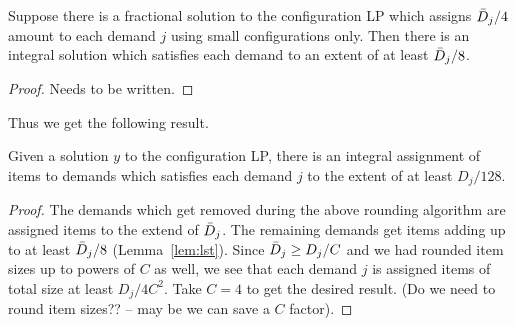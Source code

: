 \begin{lemma}
\label{lem:lst}
Suppose there is a fractional solution to the configuration LP which assigns ${\bar D}_j/4$ amount to each demand $j$ using small configurations only.
Then there is an integral solution which satisfies each demand to an extent of at least ${\bar D}_j/8$.
\end{lemma}
\begin{proof}
Needs to be written.
\end{proof}

Thus we get the following result.
\begin{theorem}
\label{thm:config}
Given a solution $y$ to the configuration LP, there is an integral assignment of items to demands which satisfies each demand $j$ to the extent of at least
$D_j/128$.
\end{theorem}
\begin{proof}
The demands which get removed during the above rounding algorithm are assigned items to the extend of ${\bar D}_j$. The remaining demands
get items adding up to at least ${\bar D}_j/8$ (Lemma~\ref{lem:lst}). Since ${\bar D}_j \geq D_j/C$ and we had rounded item sizes up to powers of $C$ as
well, we see that each demand $j$ is assigned items of total size at least $D_j/4C^2$. Take $C=4$ to get the desired result.
(Do we need to round item sizes?? -- may be we can save a $C$ factor).
\end{proof}
